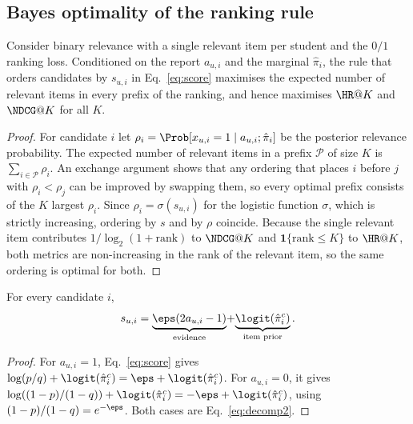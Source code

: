 \subsection{Bayes optimality of the ranking rule}\label{sec:bayes}

\begin{theorem}\label{thm:bayes}
Consider binary relevance with a single relevant item per student and the $\mathrm{0/1}$ ranking loss. Conditioned on the report $a_{u,i}$ and the marginal $\hat\pi_i$, the rule that orders candidates by $s_{u,i}$ in Eq.~\eqref{eq:score} maximises the expected number of relevant items in every prefix of the ranking, and hence maximises $\HR@K$ and $\NDCG@K$ for all $K$.
\end{theorem}

\begin{proof}
For candidate $i$ let $\rho_i=\Prob[x_{u,i}=1\mid a_{u,i};\hat\pi_i]$ be the posterior relevance probability. The expected number of relevant items in a prefix $\mathcal{P}$ of size $K$ is $\sum_{i\in\mathcal{P}}\rho_i$. An exchange argument shows that any ordering that places $i$ before $j$ with $\rho_i<\rho_j$ can be improved by swapping them, so every optimal prefix consists of the $K$ largest $\rho_i$. Since $\rho_i=\sigma(s_{u,i})$ for the logistic function $\sigma$, which is strictly increasing, ordering by $s$ and by $\rho$ coincide. Because the single relevant item contributes $1/\log_2(1+\text{rank})$ to $\NDCG@K$ and $\mathbf 1\{\text{rank}\le K\}$ to $\HR@K$, both metrics are non-increasing in the rank of the relevant item, so the same ordering is optimal for both.
\end{proof}

\begin{proposition}\label{prop:decomposition}
For every candidate $i$,
\begin{equation}\label{eq:decomp2}
s_{u,i}=\underbrace{\eps(2a_{u,i}-1)}_{\text{evidence}}\!+\!\underbrace{\logit(\hat\pi_i^{c})}_{\text{item prior}}.
\end{equation}
\end{proposition}

\begin{proof}
For $a_{u,i}=1$, Eq.~\eqref{eq:score} gives $\log(p/q)+\logit(\hat\pi_i^{c})=\eps+\logit(\hat\pi_i^{c})$. For $a_{u,i}=0$, it gives $\log((1-p)/(1-q))+\logit(\hat\pi_i^{c})=-\eps+\logit(\hat\pi_i^{c})$, using $(1-p)/(1-q)=e^{-\eps}$. Both cases are Eq.~\eqref{eq:decomp2}.
\end{proof}


